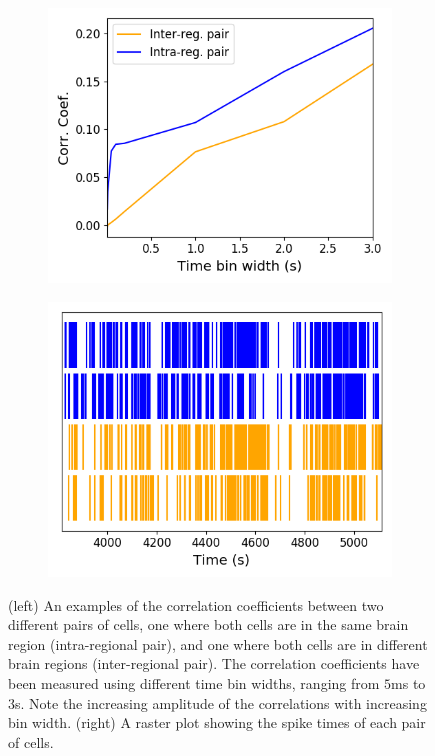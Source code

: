     \begin{figure}[h]
      \begin{subfigure}[h]{0.5\linewidth}
        \includegraphics[width=\linewidth]{figures/eight_probe/pairs_correlation.png}
        \label{fig:pair_example_correlations}
      \end{subfigure}
      \begin{subfigure}[h]{0.5\linewidth}
        \includegraphics[width=\linewidth]{figures/eight_probe/pairs_raster.png}
        \label{fig:pair_example_raster}
      \end{subfigure}
      \caption{(left) An examples of the correlation coefficients between two different pairs of cells, one where both cells are in the same brain region (intra-regional pair), and one where both cells are in different brain regions (inter-regional pair). The correlation coefficients have been measured using different time bin widths, ranging from $5$ms to $3$s. Note the increasing amplitude of the correlations with increasing bin width. (right) A raster plot showing the spike times of each pair of cells.}
      \label{fig:pair_example}
    \end{figure}

